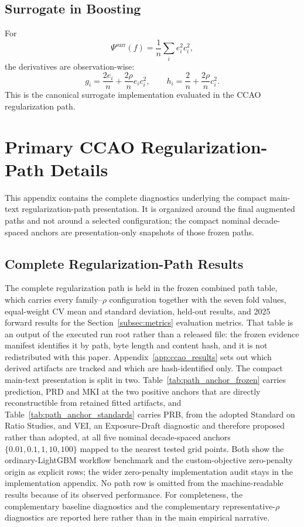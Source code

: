 \documentclass[10pt]{article}
\theoremstyle{definition}
\newcommand{\1}{\mathbf{1}}
\begin{document}
\subsection{Surrogate in Boosting}

For
\[
\Psi^{\mathrm{surr}}(f)
=
\frac{1}{n}\sum_i e_i^2c_i^2,
\]
the derivatives are observation-wise:
\[
g_i=\frac{2e_i}{n}+\frac{2\rho}{n}e_ic_i^2,
\qquad
h_i=\frac{2}{n}+\frac{2\rho}{n}c_i^2.
\]
This is the canonical surrogate implementation evaluated in the CCAO regularization path.


\section{\texorpdfstring{
Primary CCAO Regularization-Path Details}{Primary CCAO Regularization-Path Details}}
\label{app:ccao_path_details}


This appendix contains the complete diagnostics underlying the compact main-text regularization-path presentation. It is organized around the final augmented paths and not around a selected configuration; the compact nominal decade-spaced anchors are presentation-only snapshots of those frozen paths.

\subsection{Complete Regularization-Path Results}

The complete regularization path is held in the frozen combined path table, which carries every
family--$\rho$ configuration together with the seven fold values, equal-weight CV mean and
standard deviation, held-out results, and 2025 forward results for the
Section~\ref{subsec:metrics} evaluation metrics. That table is an output of the executed run root
rather than a released file: the frozen evidence manifest identifies it by path, byte length and
content hash, and it is not redistributed with this paper. Appendix~\ref{app:ccao_results} sets out
which derived artifacts are tracked and which are hash-identified only.
The compact main-text presentation is split in two. Table~\ref{tab:path_anchor_frozen} carries prediction, PRD and MKI at the two positive anchors that are directly reconstructible from retained fitted artifacts, and Table~\ref{tab:path_anchor_standards} carries PRB, from the adopted Standard on Ratio Studies, and VEI, an Exposure-Draft diagnostic and therefore proposed rather than adopted, at all five nominal decade-spaced anchors $\{0.01,0.1,1,10,100\}$ mapped to the nearest tested grid points. Both show the ordinary-LightGBM workflow benchmark and the custom-objective zero-penalty origin as explicit rows; the wider zero-penalty implementation audit stays in the implementation appendix. No path row is omitted from the machine-readable results because of its observed performance.
For completeness, the complementary baseline diagnostics and the complementary representative-$\rho$ diagnostics are reported here rather than in the main empirical narrative.
\end{document}
